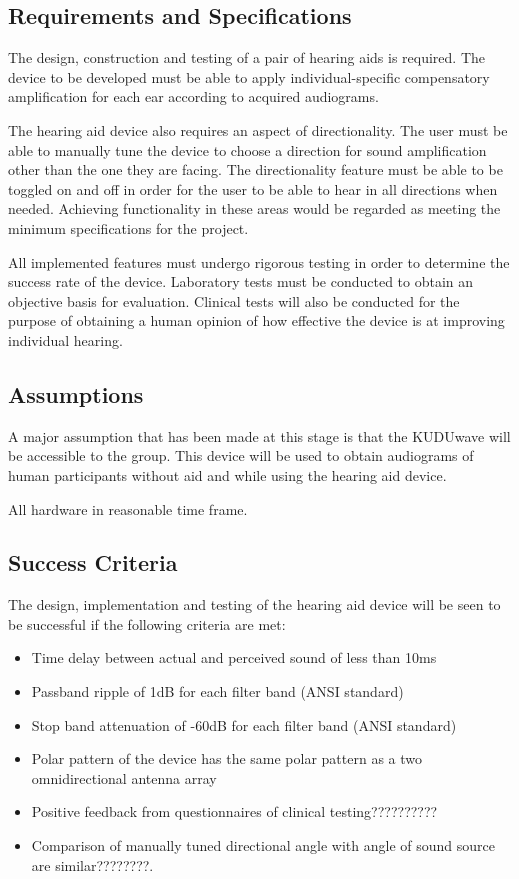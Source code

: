 \documentclass[10pt,twocolumn]{witseiepaper}
\begin{document}
\subsection{Requirements and Specifications}
The design, construction and testing of a pair of hearing aids is required. The device to be developed must be able to apply individual-specific compensatory amplification for each ear according to acquired audiograms. 

The hearing aid device also requires an aspect of directionality. The user must be able to manually tune the device to choose a direction for sound amplification other than the one they are facing. The directionality feature must be able to be toggled on and off in order for the user to be able to hear in all directions when needed. Achieving functionality in these areas would be regarded as meeting the minimum specifications for the project. 

All implemented features must undergo rigorous testing in order to determine the success rate of the device. Laboratory tests must be conducted to obtain an objective basis for evaluation. Clinical tests will also be conducted for the purpose of obtaining a human opinion of how effective the device is at improving individual hearing. 

\subsection{Assumptions}
A major assumption that has been made at this stage is that the KUDUwave will be accessible to the group. This device will be used to obtain audiograms of human participants without aid and while using the hearing aid device.

All hardware in reasonable time frame.
\subsection{Success Criteria}
The design, implementation and testing of the hearing aid device will be seen to be successful if the following criteria are met:

\begin{itemize}
	\item Time delay between actual and perceived sound of less than 10ms
	\item Passband ripple of 1dB for each filter band (ANSI standard)
	\item Stop band attenuation of -60dB for each filter band (ANSI standard)
	\item Polar pattern of the device has the same polar pattern as a two omnidirectional antenna array
	\item Positive feedback from questionnaires of clinical testing??????????
	\item Comparison of manually tuned directional angle with angle of sound source are similar????????. 	
\end{itemize}
\end{document}
